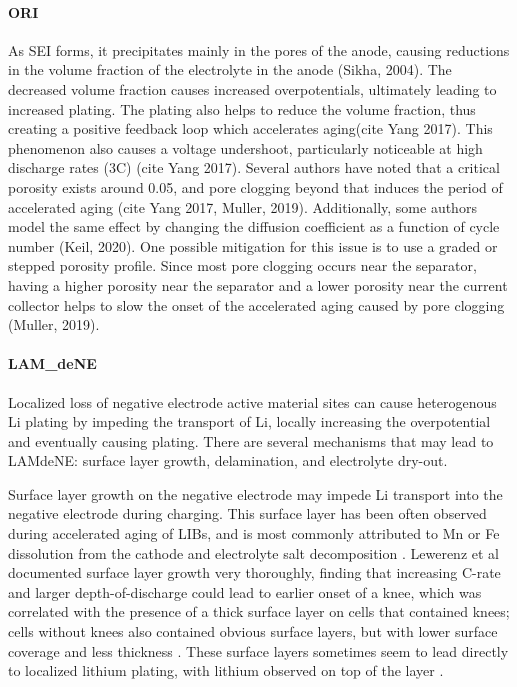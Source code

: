 \documentclass{article}
\begin{document}
\paragraph{ORI}
As SEI forms, it precipitates mainly in the pores of the anode, causing reductions in the volume fraction of the electrolyte in the anode (Sikha, 2004). The decreased volume fraction causes increased overpotentials, ultimately leading to increased plating. The plating also helps to reduce the volume fraction, thus creating a positive feedback loop which accelerates aging(cite Yang 2017). This phenomenon also causes a voltage undershoot, particularly noticeable at high discharge rates (3C) (cite Yang 2017). Several authors have noted that a critical porosity exists around 0.05, and pore clogging beyond that induces the period of accelerated aging (cite Yang 2017, Muller, 2019). Additionally, some authors model the same effect by changing the diffusion coefficient as a function of cycle number (Keil, 2020). One possible mitigation for this issue is to use a graded or stepped porosity profile. Since most pore clogging occurs near the separator, having a higher porosity near the separator and a lower porosity near the current collector helps to slow the onset of the accelerated aging caused by pore clogging (Muller, 2019).

\paragraph{LAM_{deNE}}
Localized loss of negative electrode active material sites can cause heterogenous Li plating by impeding the transport of Li, locally increasing the overpotential and eventually causing plating. There are several mechanisms that may lead to LAMdeNE: surface layer growth, delamination, and electrolyte dry-out.

Surface layer growth on the negative electrode may impede Li transport into the negative electrode during charging. This surface layer has been often observed during accelerated aging of LIBs, and is most commonly attributed to Mn or Fe dissolution from the cathode and electrolyte salt decomposition \cite{lewerenz_post-mortem_2017,lewerenz_systematic_2017,zhu_investigation_2021,stiaszny_electrochemical_2014,rahe_nanoscale_2019,keil_linear_2019,sarasketa-zabala_understanding_2015, willenberg_high-precision_2020}. Lewerenz et al documented surface layer growth very thoroughly, finding that increasing C-rate and larger depth-of-discharge could lead to earlier onset of a knee, which was correlated with the presence of a thick surface layer on cells that contained knees; cells without knees also contained obvious surface layers, but with lower surface coverage and less thickness \cite{lewerenz_post-mortem_2017,lewerenz_systematic_2017}. These surface layers sometimes seem to lead directly to localized lithium plating, with lithium observed on top of the layer \cite{zhu_investigation_2021}.
\end{document}
